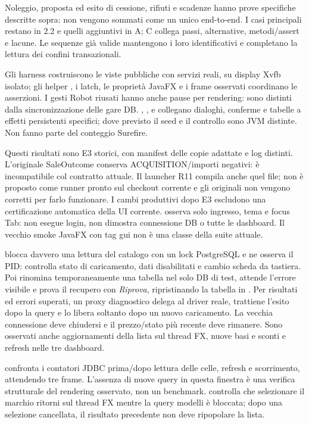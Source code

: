 Noleggio, proposta ed esito di cessione, rifiuti e scadenze hanno prove
specifiche descritte sopra: non vengono sommati come un unico end-to-end.
I casi principali restano in 2.2 e quelli aggiuntivi in A; C collega passi,
alternative, metodi/assert e lacune. Le sequenze già valide mantengono i
loro identificativi e completano la lettura dei confini transazionali.

Gli harness costruiscono le viste pubbliche con servizi reali, su display
Xvfb isolato; gli helper , i latch, le proprietà JavaFX e i frame
osservati coordinano le asserzioni. I gesti Robot riusati hanno anche
pause per rendering: sono distinti dalla sincronizzazione delle gare DB.
, ,
 e  collegano dialoghi,
conferme e tabelle a effetti persistenti specifici; dove previsto il seed
e il controllo sono JVM distinte. Non fanno parte del conteggio Surefire.

Questi risultati sono E3 storici, con manifest delle copie adattate e
log distinti. L'originale SaleOutcome conserva ACQUISITION/importi negativi:
è incompatibile col contratto attuale. Il launcher R11 compila anche quel
file; non è proposto come runner pronto sul checkout corrente e gli
originali non vengono corretti per farlo funzionare. I cambi produttivi
dopo E3 escludono una certificazione automatica della UI corrente.
 osserva solo ingresso, tema e focus Tab: non
esegue login, non dimostra connessione DB o tutte le dashboard. Il vecchio
smoke JavaFX con tag gui non è una classe della suite attuale.

 blocca davvero una lettura del catalogo
con un lock PostgreSQL e ne osserva il PID: controlla stato di caricamento,
dati disabilitati e cambio scheda da tastiera. Poi rinomina temporaneamente
una tabella nel solo DB di test, attende l'errore visibile e prova il
recupero con \emph{Riprova}, ripristinando la tabella in .
Per risultati ed errori superati, un proxy diagnostico delega al driver
reale, trattiene l'esito dopo la query e lo libera soltanto dopo un nuovo
caricamento. La vecchia connessione deve chiudersi e il prezzo/stato più
recente deve rimanere. Sono osservati anche aggiornamenti della lista sul
thread FX, nuove basi e sconti e refresh nelle tre dashboard.

 confronta i contatori JDBC prima/dopo
lettura delle celle, refresh e scorrimento, attendendo tre frame.
L'assenza di nuove query in questa finestra è una verifica strutturale
del rendering osservato, non un benchmark. 
controlla che selezionare il marchio ritorni sul thread FX mentre la
query modelli è bloccata; dopo una selezione cancellata, il risultato
precedente non deve ripopolare la lista.

